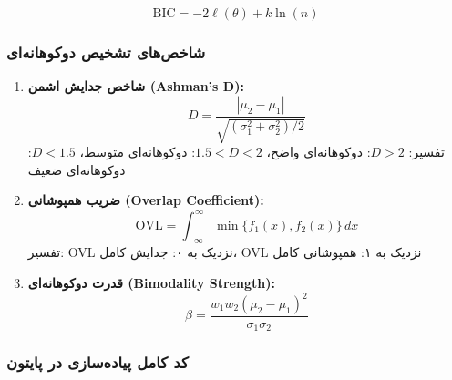 \documentclass[a4paper,12pt]{article}
\begin{document}
\begin{equation}
\text{BIC} = -2\ell(\theta) + k\ln(n)
\end{equation}

\subsubsection{شاخص‌های تشخیص دوکوهانه‌ای}

\begin{enumerate}
\item \textbf{شاخص جدایش اشمن (Ashman's D):}
\begin{equation}
D = \frac{|\mu_2 - \mu_1|}{\sqrt{(\sigma_1^2 + \sigma_2^2)/2}}
\end{equation}
تفسیر: $D > 2$: دوکوهانه‌ای واضح، $1.5 < D < 2$: دوکوهانه‌ای متوسط، $D < 1.5$: دوکوهانه‌ای ضعیف

\item \textbf{ضریب همپوشانی (Overlap Coefficient):}
\begin{equation}
\text{OVL} = \int_{-\infty}^{\infty} \min\{f_1(x), f_2(x)\} \, dx
\end{equation}
تفسیر: OVL نزدیک به ۰: جدایش کامل، OVL نزدیک به ۱: همپوشانی کامل

\item \textbf{قدرت دوکوهانه‌ای (Bimodality Strength):}
\begin{equation}
\beta = \frac{w_1 w_2 (\mu_2 - \mu_1)^2}{\sigma_1 \sigma_2}
\end{equation}
\end{enumerate}

\subsubsection{کد کامل پیاده‌سازی در پایتون}
\end{document}
